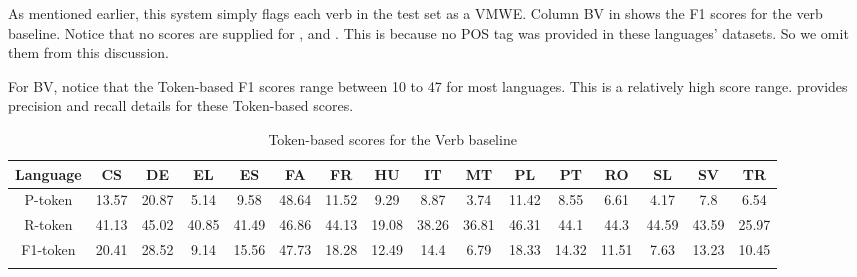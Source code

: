 \documentclass[output=paper,modfonts,nonflat,draftmode]{langsci/langscibook}
\begin{document}
As mentioned earlier, this system simply flags each verb in the test set as a VMWE. Column BV in  shows the F1 scores for the verb baseline. Notice that no scores are supplied for ,  and . This is because no POS tag was provided in these languages' datasets. So we omit them from this discussion.


For BV, notice that the Token-based F1 scores range between 10 to 47 for most languages. This is a relatively high score range.  provides precision and recall details for these Token-based scores. 

\begin{table}
\caption{\label{tbl:random-token-scores}Token-based scores for the Verb baseline}

{\scriptsize{}}%
\setlength\tabcolsep{2.0pt} %
\renewcommand{\arraystretch}{0.65} %
\begin{tabular}{cccccccccccccccc}
\lsptoprule
{\scriptsize{}Language} & {\scriptsize{}CS} & {\scriptsize{}DE} & {\scriptsize{}EL} & {\scriptsize{}ES} & {\scriptsize{}FA} & {\scriptsize{}FR} & {\scriptsize{}HU} & {\scriptsize{}IT} & {\scriptsize{}MT} & {\scriptsize{}PL} & {\scriptsize{}PT} & {\scriptsize{}RO} & {\scriptsize{}SL} & {\scriptsize{}SV} & {\scriptsize{}TR}\tabularnewline
\midrule
{\scriptsize{}P-token} & {\scriptsize{}13.57} & {\scriptsize{}20.87} & {\scriptsize{}5.14} & {\scriptsize{}9.58} & {\scriptsize{}48.64} & {\scriptsize{}11.52} & {\scriptsize{}9.29} & {\scriptsize{}8.87} & {\scriptsize{}3.74} & {\scriptsize{}11.42} & {\scriptsize{}8.55} & {\scriptsize{}6.61} & {\scriptsize{}4.17} & {\scriptsize{}7.8} & {\scriptsize{}6.54}\tabularnewline
{\scriptsize{}R-token} & {\scriptsize{}41.13} & {\scriptsize{}45.02} & {\scriptsize{}40.85} & {\scriptsize{}41.49} & {\scriptsize{}46.86} & {\scriptsize{}44.13} & {\scriptsize{}19.08} & {\scriptsize{}38.26} & {\scriptsize{}36.81} & {\scriptsize{}46.31} & {\scriptsize{}44.1} & {\scriptsize{}44.3} & {\scriptsize{}44.59} & {\scriptsize{}43.59} & {\scriptsize{}25.97}\tabularnewline
{\scriptsize{}F1-token} & {\scriptsize{}20.41} & {\scriptsize{}28.52} & {\scriptsize{}9.14} & {\scriptsize{}15.56} & {\scriptsize{}47.73} & {\scriptsize{}18.28} & {\scriptsize{}12.49} & {\scriptsize{}14.4} & {\scriptsize{}6.79} & {\scriptsize{}18.33} & {\scriptsize{}14.32} & {\scriptsize{}11.51} & {\scriptsize{}7.63} & {\scriptsize{}13.23} & {\scriptsize{}10.45}\tabularnewline
\lspbottomrule
\end{tabular}

\end{table}
\end{document}

